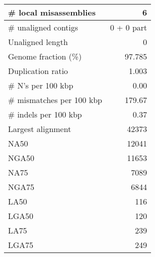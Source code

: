 \documentclass[12pt,a4paper]{article}
\begin{document}
\begin{table}[ht]
\begin{center}
\begin{tabular}{|l*{1}{|r}|}
\# local misassemblies & 6 \\ \hline
\# unaligned contigs & 0 + 0 part \\ \hline
Unaligned length & 0 \\ \hline
Genome fraction (\%) & 97.785 \\ \hline
Duplication ratio & 1.003 \\ \hline
\# N's per 100 kbp & 0.00 \\ \hline
\# mismatches per 100 kbp & 179.67 \\ \hline
\# indels per 100 kbp & 0.37 \\ \hline
Largest alignment & 42373 \\ \hline
NA50 & 12041 \\ \hline
NGA50 & 11653 \\ \hline
NA75 & 7089 \\ \hline
NGA75 & 6844 \\ \hline
LA50 & 116 \\ \hline
LGA50 & 120 \\ \hline
LA75 & 239 \\ \hline
LGA75 & 249 \\ \hline
\end{tabular}
\end{center}
\end{table}
\end{document}
